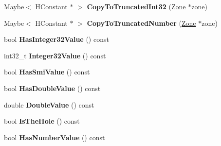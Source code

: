 \begin{DoxyCompactItemize}
\item 
\hypertarget{classv8_1_1internal_1_1_v8___f_i_n_a_l_a21d81478a05aa48e3daedc632b855950}{}Maybe$<$ H\+Constant $\ast$ $>$ {\bfseries Copy\+To\+Truncated\+Int32} (\hyperlink{classv8_1_1internal_1_1_zone}{Zone} $\ast$zone)\label{classv8_1_1internal_1_1_v8___f_i_n_a_l_a21d81478a05aa48e3daedc632b855950}

\item 
\hypertarget{classv8_1_1internal_1_1_v8___f_i_n_a_l_a604eefce7c1d14b16ff09b3560731994}{}Maybe$<$ H\+Constant $\ast$ $>$ {\bfseries Copy\+To\+Truncated\+Number} (\hyperlink{classv8_1_1internal_1_1_zone}{Zone} $\ast$zone)\label{classv8_1_1internal_1_1_v8___f_i_n_a_l_a604eefce7c1d14b16ff09b3560731994}

\item 
\hypertarget{classv8_1_1internal_1_1_v8___f_i_n_a_l_a9157951916e32590fe3105fe404c0a2a}{}bool {\bfseries Has\+Integer32\+Value} () const \label{classv8_1_1internal_1_1_v8___f_i_n_a_l_a9157951916e32590fe3105fe404c0a2a}

\item 
\hypertarget{classv8_1_1internal_1_1_v8___f_i_n_a_l_a4195792653b4f95800ae95e2150b721c}{}int32\+\_\+t {\bfseries Integer32\+Value} () const \label{classv8_1_1internal_1_1_v8___f_i_n_a_l_a4195792653b4f95800ae95e2150b721c}

\item 
\hypertarget{classv8_1_1internal_1_1_v8___f_i_n_a_l_a90634f671f3c0d650452b0b6fe15423e}{}bool {\bfseries Has\+Smi\+Value} () const \label{classv8_1_1internal_1_1_v8___f_i_n_a_l_a90634f671f3c0d650452b0b6fe15423e}

\item 
\hypertarget{classv8_1_1internal_1_1_v8___f_i_n_a_l_a81e842cb191841d3d22e18e69c68e34b}{}bool {\bfseries Has\+Double\+Value} () const \label{classv8_1_1internal_1_1_v8___f_i_n_a_l_a81e842cb191841d3d22e18e69c68e34b}

\item 
\hypertarget{classv8_1_1internal_1_1_v8___f_i_n_a_l_afdeb5ca4fb2a1bad0fc164a195777c96}{}double {\bfseries Double\+Value} () const \label{classv8_1_1internal_1_1_v8___f_i_n_a_l_afdeb5ca4fb2a1bad0fc164a195777c96}

\item 
\hypertarget{classv8_1_1internal_1_1_v8___f_i_n_a_l_a5528049d0af89d15ffd40aa0454250cf}{}bool {\bfseries Is\+The\+Hole} () const \label{classv8_1_1internal_1_1_v8___f_i_n_a_l_a5528049d0af89d15ffd40aa0454250cf}

\item 
\hypertarget{classv8_1_1internal_1_1_v8___f_i_n_a_l_a4cae1644cefd8e359de4702a55dfa821}{}bool {\bfseries Has\+Number\+Value} () const \label{classv8_1_1internal_1_1_v8___f_i_n_a_l_a4cae1644cefd8e359de4702a55dfa821}


\end{DoxyCompactItemize}
